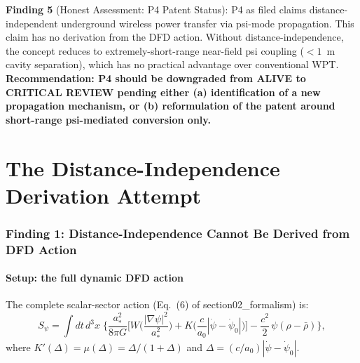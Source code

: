 \documentclass[11pt]{article}
\begin{document}
\begin{tcolorbox}[colback=blue!5!white, colframe=blue!60!black,
  title=\textbf{W4i14 P4: Five Key Findings}]
\textbf{Finding 5} (Honest Assessment: P4 Patent Status):
P4 as filed claims distance-independent underground wireless power transfer
via psi-mode propagation. This claim has no derivation from the DFD action.
Without distance-independence, the concept reduces to extremely-short-range
near-field psi coupling ($< 1$~m cavity separation), which has no practical
advantage over conventional WPT. \textbf{Recommendation: P4 should be
downgraded from ALIVE to CRITICAL REVIEW pending either (a) identification
of a new propagation mechanism, or (b) reformulation of the patent around
short-range psi-mediated conversion only.}

\end{tcolorbox}

\newpage

\part{The Distance-Independence Derivation Attempt}
\label{part:derivation}

\section{Finding 1: Distance-Independence Cannot Be Derived from DFD Action}
\label{sec:distance-independence}

\subsection{Setup: the full dynamic DFD action}

The complete scalar-sector action (Eq.~(6) of section02\_formalism) is:
\begin{equation}
S_\psi = \int dt\,d^3x\;\Biggl\{
  \frac{a_*^2}{8\pi G}\biggl[
    W\!\biggl(\frac{|\nabla\psi|^2}{a_*^2}\biggr)
    + K\!\biggl(\frac{c}{a_0}|\dot\psi{-}\dot\psi_0|\biggr)
  \biggr]
  - \frac{c^2}{2}\,\psi(\rho - \bar\rho)
\Biggr\},
\label{eq:full-action}
\end{equation}
where $K'(\Delta) = \mu(\Delta) = \Delta/(1+\Delta)$ and
$\Delta = (c/a_0)|\dot\psi - \dot\psi_0|$.
\end{document}
